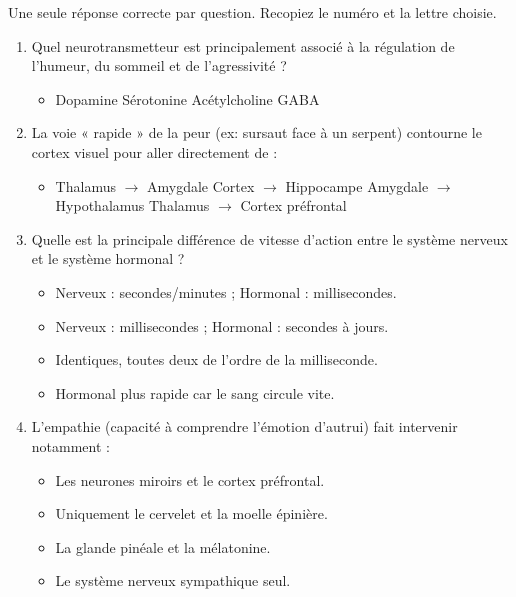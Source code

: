 \documentclass[11pt]{article}
\begin{document}
\begin{exercice}
Une seule réponse correcte par question. Recopiez le numéro et la lettre choisie.
\begin{enumerate}
    \item Quel neurotransmetteur est principalement associé à la régulation de l'humeur, du sommeil et de l'agressivité ?
    \begin{itemize}
        \item[A] Dopamine \quad [B] Sérotonine \quad [C] Acétylcholine \quad [D] GABA
    \end{itemize}
    \item La voie « rapide » de la peur (ex: sursaut face à un serpent) contourne le cortex visuel pour aller directement de :
    \begin{itemize}
        \item[A] Thalamus $\to$ Amygdale \quad [B] Cortex $\to$ Hippocampe \quad [C] Amygdale $\to$ Hypothalamus \quad [D] Thalamus $\to$ Cortex préfrontal
    \end{itemize}
    \item Quelle est la principale différence de vitesse d'action entre le système nerveux et le système hormonal ?
    \begin{itemize}
        \item[A] Nerveux : secondes/minutes ; Hormonal : millisecondes.
        \item[B] Nerveux : millisecondes ; Hormonal : secondes à jours.
        \item[C] Identiques, toutes deux de l'ordre de la milliseconde.
        \item[D] Hormonal plus rapide car le sang circule vite.
    \end{itemize}
    \item L'empathie (capacité à comprendre l'émotion d'autrui) fait intervenir notamment :
    \begin{itemize}
        \item[A] Les neurones miroirs et le cortex préfrontal.
        \item[B] Uniquement le cervelet et la moelle épinière.
        \item[C] La glande pinéale et la mélatonine.
        \item[D] Le système nerveux sympathique seul.
    \end{itemize}
\end{enumerate}
\end{exercice}
\end{document}
